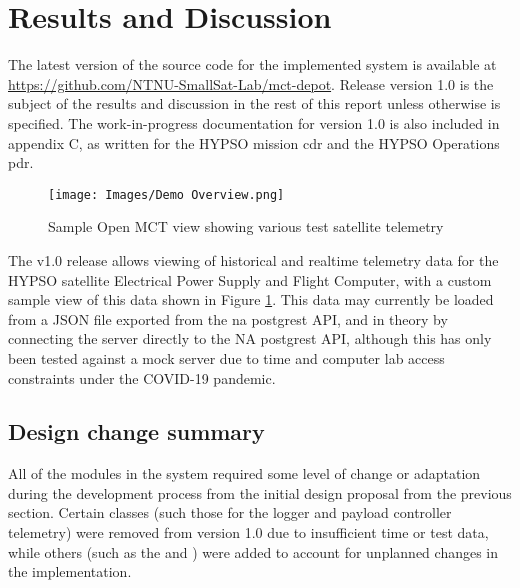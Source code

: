 \begin{comment}
What was good/bad about the implementation?
 - Initial design was too simple, and didn’t account for various complexities in the what was required for Open MCT and other sources
 - DB design: Was this good? Could it be done better after making changes to how Open MCT best works with data?

What worked, and what didn’t?
\end{comment}

\section{Results and Discussion}
The latest version of the source code for the implemented system is available at \url{https://github.com/NTNU-SmallSat-Lab/mct-depot}. Release version 1.0 is the subject of the results and discussion in the rest of this report unless otherwise is specified. The work-in-progress documentation for version 1.0 is also included in appendix C, as written for the HYPSO mission \Gls{cdr} and the HYPSO Operations \Gls{pdr}.

\begin{figure}[ht]
  \centering
  \texttt{[image: Images/Demo Overview.png]}
  \caption{Sample Open MCT view showing various test satellite telemetry}
  \label{fig:demoview}
\end{figure}

The v1.0 release allows viewing of historical and realtime telemetry data for the HYPSO satellite Electrical Power Supply and Flight Computer, with a custom sample view of this data shown in Figure \ref{fig:demoview}. This data may currently be loaded from a JSON file exported from the \acrshort{na} \Gls{postgrest} API, and in theory by connecting the server directly to the NA \Gls{postgrest} API, although this has only been tested against a mock server due to time and computer lab access constraints under the COVID-19 pandemic.

\subsection{Design change summary}
All of the modules in the system required some level of change or adaptation during the development process from the initial design proposal from the previous section. Certain classes (such those for the logger and payload controller telemetry) were removed from version 1.0 due to insufficient time or test data, while others (such as the  and ) were added to account for unplanned changes in the implementation.

